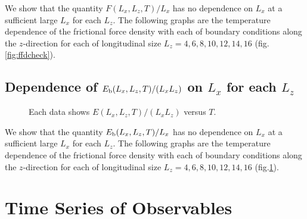 We show that the quantity $F(L_{x}, L_{z}, T)/L_{x}$ has no dependence on $L_{x}$ at a sufficient large $L_{x}$ for each $L_{z}$. The following graphs are the temperature dependence of the frictional force density with each of boundary conditions along the $z$-direction for each of longitudinal size $L_{z} = 4, 6, 8, 10, 12, 14, 16$ (fig.\ref{fig:ffdcheck}).

\subsection{Dependence of $E_{\rm b}(L_{x}, L_{z}, T)/(L_{x}L_{z})$ on $L_{x}$ for each $L_{z}$}

\begin{figure}[htbp]
	\centering
	
	
	
	\caption{Each data shows $E(L_{x}, L_{z}, T)/(L_{x}L_{z})$ versus $T$.}
	\label{fig:ebcheck}
\end{figure}

We show that the quantity $E_{\rm b}(L_{x}, L_{z}, T)/L_{x}$ has no dependence on $L_{x}$ at a sufficient large $L_{x}$ for each $L_{z}$. The following graphs are the temperature dependence of the frictional force density with each of boundary conditions along the $z$-direction for each of longitudinal size $L_{z} = 4, 6, 8, 10, 12, 14, 16$ (fig.\ref{fig:ebcheck}).



\section{Time Series of Observables}\label{appsec:timeconvcheck}

